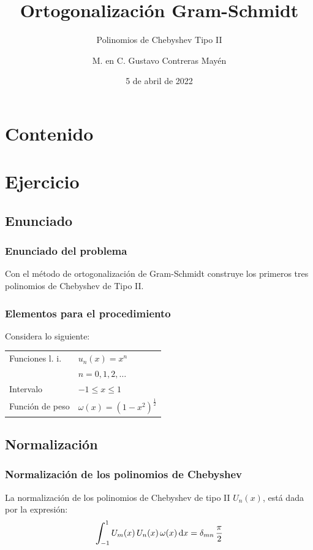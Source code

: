 \documentclass[12pt]{beamer}
\date{5 de abril de 2022}
\title{\large{Ortogonalización Gram-Schmidt}}
\subtitle{Polinomios de Chebyshev Tipo II}
\author{M. en C. Gustavo Contreras Mayén}
\begin{document}
\maketitle
\fontsize{14}{14}\selectfont
{}

\section*{Contenido}

\section{Ejercicio}
\subsection{Enunciado}

\begin{frame}
\frametitle{Enunciado del problema}
Con el método de ortogonalización de Gram-Schmidt construye los primeros tres polinomios de Chebyshev de Tipo II.
\end{frame}
\begin{frame}
\frametitle{Elementos para el procedimiento}
Considera lo siguiente:
\begin{table}
\begin{tabular}{l l}
Funciones l. i. & $u_{n}(x) = x^{n}$ \\
 & $n = 0, 1, 2, \ldots$ \\ \pause
Intervalo & $-1 \leq x \leq 1$ \\ \pause
Función de peso & $\omega (x) = (1 -x^{2})^{\frac{1}{2}}$
\end{tabular}
\end{table}
\end{frame}

\subsection{Normalización}

\begin{frame}
\frametitle{Normalización de los polinomios de Chebyshev}
La normalización de los polinomios de Chebyshev de tipo II $U_{n}(x)$, está dada por la expresión:
\pause
\begin{align*}
\scaleint{6ex}_{\bs -1}^{1} \, U_{m}(x) \, U_{n} (x) \, \omega (x) \dd{x} = \delta_{mn} \, \dfrac{\pi}{2}
\end{align*}
\end{frame}
\end{document}
